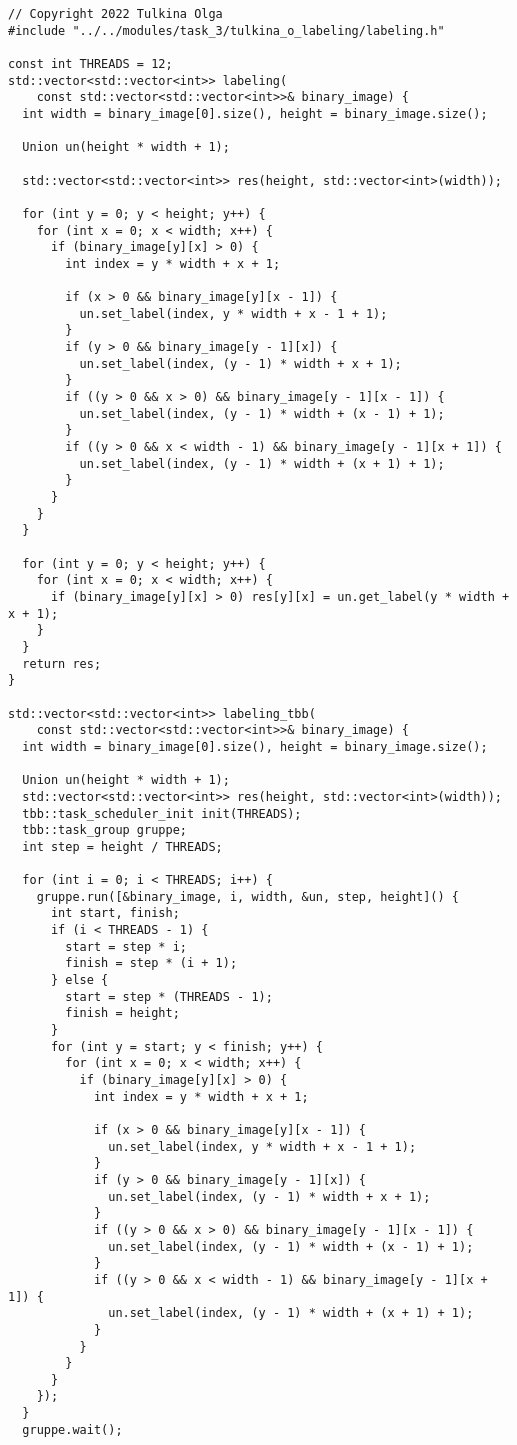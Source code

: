 \documentclass[12pt]{article}
\begin{document}
\begin{lstlisting}
// Copyright 2022 Tulkina Olga
#include "../../modules/task_3/tulkina_o_labeling/labeling.h"

const int THREADS = 12;
std::vector<std::vector<int>> labeling(
    const std::vector<std::vector<int>>& binary_image) {
  int width = binary_image[0].size(), height = binary_image.size();

  Union un(height * width + 1);

  std::vector<std::vector<int>> res(height, std::vector<int>(width));

  for (int y = 0; y < height; y++) {
    for (int x = 0; x < width; x++) {
      if (binary_image[y][x] > 0) {
        int index = y * width + x + 1;

        if (x > 0 && binary_image[y][x - 1]) {
          un.set_label(index, y * width + x - 1 + 1);
        }
        if (y > 0 && binary_image[y - 1][x]) {
          un.set_label(index, (y - 1) * width + x + 1);
        }
        if ((y > 0 && x > 0) && binary_image[y - 1][x - 1]) {
          un.set_label(index, (y - 1) * width + (x - 1) + 1);
        }
        if ((y > 0 && x < width - 1) && binary_image[y - 1][x + 1]) {
          un.set_label(index, (y - 1) * width + (x + 1) + 1);
        }
      }
    }
  }

  for (int y = 0; y < height; y++) {
    for (int x = 0; x < width; x++) {
      if (binary_image[y][x] > 0) res[y][x] = un.get_label(y * width + x + 1);
    }
  }
  return res;
}

std::vector<std::vector<int>> labeling_tbb(
    const std::vector<std::vector<int>>& binary_image) {
  int width = binary_image[0].size(), height = binary_image.size();

  Union un(height * width + 1);
  std::vector<std::vector<int>> res(height, std::vector<int>(width));
  tbb::task_scheduler_init init(THREADS);
  tbb::task_group gruppe;
  int step = height / THREADS;

  for (int i = 0; i < THREADS; i++) {
    gruppe.run([&binary_image, i, width, &un, step, height]() {
      int start, finish;
      if (i < THREADS - 1) {
        start = step * i;
        finish = step * (i + 1);
      } else {
        start = step * (THREADS - 1);
        finish = height;
      }
      for (int y = start; y < finish; y++) {
        for (int x = 0; x < width; x++) {
          if (binary_image[y][x] > 0) {
            int index = y * width + x + 1;

            if (x > 0 && binary_image[y][x - 1]) {
              un.set_label(index, y * width + x - 1 + 1);
            }
            if (y > 0 && binary_image[y - 1][x]) {
              un.set_label(index, (y - 1) * width + x + 1);
            }
            if ((y > 0 && x > 0) && binary_image[y - 1][x - 1]) {
              un.set_label(index, (y - 1) * width + (x - 1) + 1);
            }
            if ((y > 0 && x < width - 1) && binary_image[y - 1][x + 1]) {
              un.set_label(index, (y - 1) * width + (x + 1) + 1);
            }
          }
        }
      }
    });
  }
  gruppe.wait();


\end{lstlisting}
\end{document}
